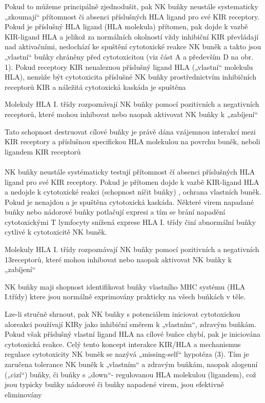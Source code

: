 \documentclass[czech,DP]{thesiskiv}
\begin{document}
Pokud to můžeme principálně zjednodušit, pak NK buňky neustále
systematicky „zkoumají“ přítomnost či absenci příslušných HLA
ligand pro své KIR receptory. Pokud je příslušný HLA ligand (HLA
molekula) přítomen, pak dojde k vazbě KIR-ligand HLA a jelikož za
normálních okolností vždy inhibiční KIR převládají nad aktivačními,
nedochází ke spuštění cytotoxické reakce NK buněk a takto jsou
„vlastní“ buňky chráněny před cytotoxicitou (viz část A a především D
na obr. 1). Pokud receptory KIR nenaleznou příslušný ligand HLA
(„vlastní“ molekulu HLA), nemůže být cytotoxicita příslušné NK buňky
prostřednictvím inhibičních receptorů KIR a náležitá cytotoxická
kaskáda je spuštěna


Molekuly HLA I. třídy rozpoznávají NK buňky pomocí pozitivních a negativních receptorů, které mohou inhibovat nebo naopak aktivovat NK buňky k „zabíjení“

Tato schopnost destruovat cílové buňky je právě dána vzájemnou
interakcí mezi KIR receptory a příslušnou specifickou HLA molekulou
na povrchu buněk, neboli ligandem KIR receptorů
\\
\\
NK buňky neustále systématicky testují přítomnost čí absenci příslušných HLA ligand pro své KIR receptory. Pokud je přítomen dojde k vazbě KIR-ligand HLA a nedojde k cytotoxické reakci (schopnost níčit buňky) , ochrana vlastních buněk. Pokud je 
nenajdou a je spuštěna cytotoxická kaskáda.
Některé virem napadané buňky nebo nádorové buňky potlačují expresi a tím se brání napadění cytotoxickými T lymfocyty
snížená exprese HLA I. třídy činí abnormální buňky cytlivé k cytotoxicitě NK buněk.

 Molekuly HLA I. třídy rozpoznávají NK buňky pomocí pozitivních a negativních
13receptorů, které mohou inhibovat nebo naopak aktivovat NK buňky k „zabíjení“

NK buňky maji shopnost identifikovat buňky vlastního MHC systému (HLA I.třídy) ktere jsou normálně exprimovány prakticky na všech buňkách v těle. 

Lze-li stručně shrnout, pak NK buňky s potenciálem iniciovat
cytotoxickou aloreakci používají KIRy jako inhibiční směrem k
„vlastním“, zdravým buňkám. Pokud však příslušný vlastní ligand
HLA na cílové buňce chybí, pak je iniciována cytotoxická reakce.
Celý tento koncept interakce KIR/HLA
a mechanismus regulace
cytotoxicity NK buněk se nazývá „missing-self“ hypotéza (3). Tím je
zaručena tolerance NK buněk k „vlastním“ a zdravým buňkám,
naopak alogenní („cizí“) buňky, či buňky s „down“- regulovanou HLA
molekulou (ligandem), což jsou typicky buňky nádorové či buňky
napadené virem, jsou efektivně eliminovány
\end{document}
